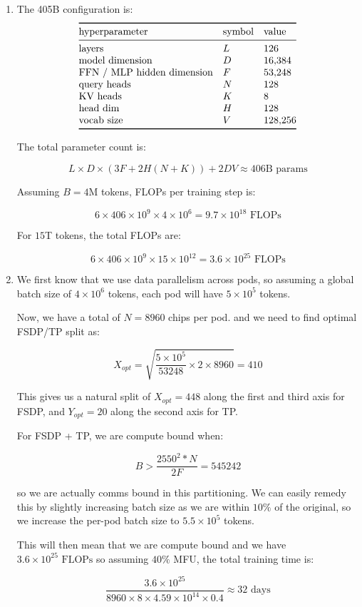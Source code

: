 \documentclass[11pt]{article}
\newcommand{\D}{D}
\newcommand{\F}{F}
\begin{document}
\subsection{}
\begin{enumerate}[label=(\alph*)]
  \item The 405B configuration is:
  \[
  \begin{array}{@{}lll@{}}
  \toprule
  \text{hyperparameter} & \text{symbol} & \text{value} \\
  \midrule
  \text{layers} & L & 126 \\
  \text{model dimension} & \D & 16{,}384 \\
  \text{FFN / MLP hidden dimension} & \F & 53{,}248 \\
  \text{query heads} & N & 128 \\
  \text{KV heads} & K & 8 \\
  \text{head dim} & H & 128 \\
  \text{vocab size} & V & 128{,}256 \\
  \bottomrule
  \end{array}
  \]

  The total parameter count is:

  $$ L \times D  \times (3F + 2H(N + K)) + 2DV \approx 406 \text{B params}$$

  Assuming $B=4$M tokens, FLOPs per training step is:

  $$ 6 \times 406\times 10^9 \times 4\times 10^6 = 9.7\times 10^{18}\text{ FLOPs}$$

  For $15$T tokens, the total FLOPs are:

  $$ 6 \times 406\times 10^9 \times 15\times 10^{12} = 3.6\times 10^{25}\text{ FLOPs}$$

  \item We first know that we use data parallelism across pods, so assuming a global batch size of $4 \times 10^6$ tokens,
  each pod will have $5 \times 10^5$ tokens.

  Now, we have a total of $N=8960$ chips per pod. and we need to find optimal FSDP/TP split as:

  $$ X_{opt} = \sqrt{\frac{5 \times 10^5}{53248} \times 2 \times 8960} = 410 $$

  This gives us a natural split of $X_{opt} = 448$ along the first and third axis for FSDP, and $Y_{opt} = 20$ along the second axis
  for TP.

  For FSDP + TP, we are compute bound when:

  $$ B > \frac{2550^2 * N}{2F} = 545242 $$

  so we are actually comms bound in this partitioning. We can easily remedy this by slightly increasing batch size as we are within 
  $10\%$ of the original, so we increase the per-pod batch size to $5.5\times 10^5$ tokens.

  This will then mean that we are compute bound and we have $3.6\times 10^{25}\text{ FLOPs}$ so assuming $40\%$ MFU, the total training time is:

  $$ \frac{3.6\times 10^{25}}{8960 \times 8 \times 4.59 \times 10^14 \times 0.4} \approx 32 \text{ days}$$

\end{enumerate}
\end{document}

